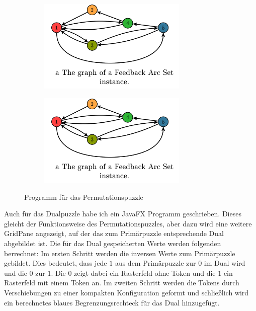 \documentclass[seminar,german]{algothesis}
\begin{document}
\begin{figure}[ht]
	\centering
	\begin{subfigure}{.4\textwidth}
		\includegraphics[width=0.78\textwidth]{graph}
    \end{subfigure}%
    \begin{subfigure}{.4\textwidth}
		\includegraphics[width=0.78\textwidth]{graph}
    \end{subfigure}
    \caption{Programm für das Permutationspuzzle}
	\label{fig:14}
\end{figure}
\newpage
\noindent Auch für das Dualpuzzle habe ich ein JavaFX Programm geschrieben. Dieses gleicht der Funktionsweise des Permutationspuzzles, aber dazu wird eine weitere GridPane angezeigt, auf der das zum Primärpuzzle entsprechende Dual abgebildet ist. Die für das Dual gespeicherten Werte werden folgenden berrechnet: Im ersten Schritt werden die inversen Werte zum Primärpuzzle gebildet. Dies bedeutet, dass jede \glqq$1$\grqq{}  aus dem Primärpuzzle zur \glqq$0$\grqq{} im Dual wird und die \glqq$0$\grqq{} zur \glqq$1$\grqq{}. Die \glqq$0$\grqq{} zeigt dabei ein Rasterfeld ohne Token und die \glqq$1$\grqq{} ein Rasterfeld mit einem Token an. Im zweiten Schritt werden die Tokens durch Verschiebungen zu einer kompakten Konfiguration geformt und schließlich wird ein berechnetes blaues Begrenzungsrechteck für das Dual hinzugefügt.
\end{document}
